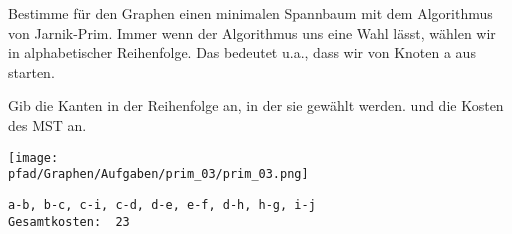 ﻿\question[3]
Bestimme für den Graphen einen minimalen Spannbaum mit dem Algorithmus von Jarnik-Prim. Immer wenn der Algorithmus uns eine
Wahl lässt, wählen wir in alphabetischer Reihenfolge. Das bedeutet u.a., dass wir von Knoten a aus starten.

Gib die Kanten in der Reihenfolge an, in der sie gewählt werden. und die Kosten des MST an.


\texttt{[image: \\pfad/Graphen/Aufgaben/prim\_03/prim\_03.png]}
\begin{solutionbox}{3cm}
\begin{lstlisting}
a-b, b-c, c-i, c-d, d-e, e-f, d-h, h-g, i-j
Gesamtkosten:  23
\end{lstlisting}
\end{solutionbox}
